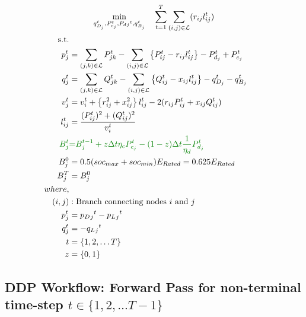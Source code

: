 \begin{gather}
    \min_{q_{D_j}^t,
	P_{c_j}^t, P_d{_j}^t, q_{B_j}^t} \quad
	\sum_{t = 1}^{T} \sum_{(i, j) \in \mathcal{L}} (r_{ij}l_{ij}^t) \\
	\begin{align}
		\text{s.t.} & {}\nonumber \\
		{p_j^t} & = {\sum_{(j, k) \in \mathcal{L}} P_{jk}^t - \sum_{(i, j) \in \mathcal{L}}\left\{P_{ij}^t - r_{ij}l_{ij}^t\right\} - P_{d_j}^t + P_{c_j}^t} && \\
		{q_j^t} & = {\sum_{(j, k) \in \mathcal{L}} Q_{jk}^t - \sum_{(i, j) \in \mathcal{L}}\left\{Q_{ij}^t - x_{ij}l_{ij}^t\right\} - q_{D_j}^t - q_{B_j}^t} && \\
		{v_j^t} & = {v_{i}^t +  \left\{r_{ij}^2 + x_{ij}^2\right\}l_{ij}^t - 2(r_{ij}P_{ij}^t + x_{ij}Q_{ij}^t)} && \\
		{l_{ij}^t} & = {\frac{(P_{ij}^{t})^2 + (Q_{ij}^{t})^2}{v_i^t}} \\
		{\color{darkgreen}{ B_{j}^{t} }} &\color{darkgreen}{=} { \color{darkgreen}{ B_{j}^{t-1} + z \Delta t  \eta_c P_{c_j}^t - (1-z) \Delta t\frac{1}{\eta_d} P_{d_j}^t } } \\
		{ B_{j}^{0} } &= { 0.5(soc_{max}+soc_{min})E_{Rated} = 0.625E_{Rated}} \\
		{ B_{j}^{T} } &= { B_{j}^{0}} \\
		{where,} & {} \\
		{(i, j)} &: {\text{Branch connecting nodes $i$ and $j$}} \\
		{p_j^t} &= {p_D{_j}^t - p_L{_j}^t} \\
		{q_j^t} &= {-q_L{_j}^t} \\
		{t} &= {\{1, 2, \ldots T\}} \\
		{z} &= {\{0, 1\}}
	\end{align}
\end{gather}

\subsection*{DDP Workflow: Forward Pass for non-terminal \\ time-step $t \in \{1, 2, \ldots T-1\}$}


